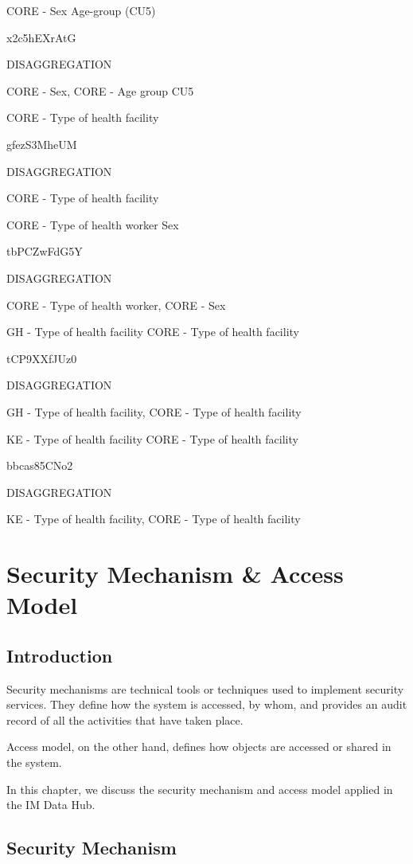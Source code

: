 \documentclass[]{book}
\begin{document}
CORE - Sex \textbar{} Age-group (CU5)

x2c5hEXrAtG

DISAGGREGATION

CORE - Sex, CORE - Age group CU5

CORE - Type of health facility

gfezS3MheUM

DISAGGREGATION

CORE - Type of health facility

CORE - Type of health worker \textbar{} Sex

tbPCZwFdG5Y

DISAGGREGATION

CORE - Type of health worker, CORE - Sex

GH - Type of health facility \textbar{} CORE - Type of health facility

tCP9XXfJUz0

DISAGGREGATION

GH - Type of health facility, CORE - Type of health facility

KE - Type of health facility \textbar{} CORE - Type of health facility

bbcas85CNo2

DISAGGREGATION

KE - Type of health facility, CORE - Type of health facility

\hypertarget{access}{%
\chapter{Security Mechanism \& Access Model}\label{access}}

\hypertarget{introduction-3}{%
\section{Introduction}\label{introduction-3}}

Security mechanisms are technical tools or techniques used to implement security services. They define how the system is accessed, by whom, and provides an audit record of all the activities that have taken place.

Access model, on the other hand, defines how objects are accessed or shared in the system.

In this chapter, we discuss the security mechanism and access model applied in the IM Data Hub.

\hypertarget{security-mechanism}{%
\section{Security Mechanism}\label{security-mechanism}}
\end{document}
